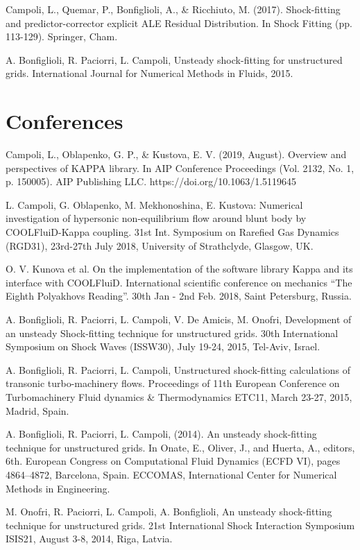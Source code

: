 \documentclass[11pt]{res} %
\begin{document}
\begin{resume}
Campoli, L., Quemar, P., Bonfiglioli, A., \& Ricchiuto, M. (2017). Shock-fitting and predictor-corrector explicit ALE Residual Distribution. In Shock Fitting (pp. 113-129). Springer, Cham.

A. Bonfiglioli, R. Paciorri, L. Campoli, Unsteady shock-fitting for unstructured grids. International Journal for Numerical Methods in Fluids, 2015.

\section{{Conferences}} 
Campoli, L., Oblapenko, G. P., \& Kustova, E. V. (2019, August). Overview and perspectives of KAPPA library. In AIP Conference Proceedings (Vol. 2132, No. 1, p. 150005). AIP Publishing LLC. https://doi.org/10.1063/1.5119645

L. Campoli, G. Oblapenko, M. Mekhonoshina, E. Kustova: Numerical investigation of hypersonic non-equilibrium flow around blunt body by COOLFluiD-Kappa coupling. 31st Int. Symposium on Rarefied Gas Dynamics (RGD31), 23rd-27th July 2018, University of Strathclyde,
Glasgow, UK.

O. V. Kunova et al. On the implementation of the software library Kappa and its interface with
COOLFluiD. International scientific conference on mechanics “The Eighth Polyakhovs
Reading”. 30th Jan - 2nd Feb. 2018, Saint Petersburg, Russia.

A. Bonfiglioli, R. Paciorri, L. Campoli, V. De Amicis, M. Onofri, Development of an unsteady
Shock-fitting technique for unstructured grids. 30th International Symposium on Shock Waves
(ISSW30), July 19-24, 2015, Tel-Aviv, Israel.

A. Bonfiglioli, R. Paciorri, L. Campoli, Unstructured shock-fitting calculations of transonic turbo-machinery flows. Proceedings of 11th European Conference on Turbomachinery Fluid dynamics \& Thermodynamics ETC11, March 23-27, 2015, Madrid, Spain.

A. Bonfiglioli, R. Paciorri, L. Campoli, (2014). An unsteady shock-fitting technique for unstructured grids. In Onate, E., Oliver, J., and Huerta, A., editors, 6th. European Congress on Computational Fluid Dynamics (ECFD VI), pages 4864--4872, Barcelona, Spain. ECCOMAS, International Center for Numerical Methods in Engineering.

\vspace{8pt}
M. Onofri, R. Paciorri, L. Campoli, A. Bonfiglioli, An unsteady shock-fitting technique for
unstructured grids. 21st International Shock Interaction Symposium ISIS21, August 3-8, 2014, Riga, Latvia.


\end{resume}
\end{document}
